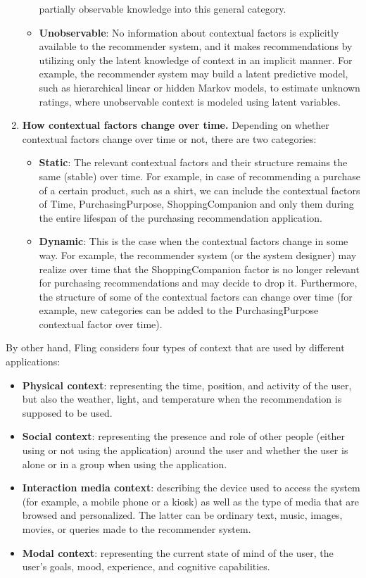 \begin{enumerate}
\begin{itemize}
	partially observable knowledge into this general category.
	\item \textbf{Unobservable}: No information about contextual factors is 
	explicitly available to the recommender system, and it makes recommendations 
	by utilizing only the latent knowledge of context in an implicit manner. 
	For example, the recommender system may build a latent predictive model, 
	such as hierarchical linear or hidden Markov models, to estimate unknown 
	ratings, where unobservable context is modeled using latent variables.
	\end{itemize}
\item \textbf{How contextual factors change over time.} Depending on whether 
contextual factors change over time or not, there are two categories: 
	\begin{itemize}
	\item \textbf{Static}: The relevant contextual factors and their structure
	remains the same (stable) over time. For example, in case of recommending a
	purchase of a certain product, such as a shirt, we can include the
	contextual factors of Time, PurchasingPurpose, ShoppingCompanion and only
	them during the entire lifespan of the purchasing recommendation
	application.
	\item \textbf {Dynamic}: This is the case when the contextual factors change in 
	some way. For example, the recommender system (or the system designer) may 
	realize over time that the ShoppingCompanion factor is no longer relevant for 
	purchasing recommendations and may decide to drop it. Furthermore, the structure 
	of some of the contextual factors can change over time (for example, new 
	categories can be added to the PurchasingPurpose contextual factor over time).
	\end{itemize}
\end{enumerate} 
By other hand, Fling\cite{fling2009mobile} considers four types of context that 
are used by different applications: 
\begin{itemize} 
\item \textbf{Physical context}: representing the time, position, and activity 
of the user, but also the weather, light, and temperature when the 
recommendation is supposed to be used. 
\item \textbf{Social context}: representing the presence
and role of other people (either using or not using the application) around the
user and whether the user is alone or in a group when using the application.
\item \textbf{Interaction media context}: describing the device used to access
the system (for example, a mobile phone or a kiosk) as well as the type of media
that are browsed and personalized. The latter can be ordinary text, music,
images, movies, or queries made to the recommender system. 
\item \textbf{Modal context}: representing the current state of mind of the user, 
the user’s goals, mood, experience, and cognitive capabilities.  
\end{itemize}
